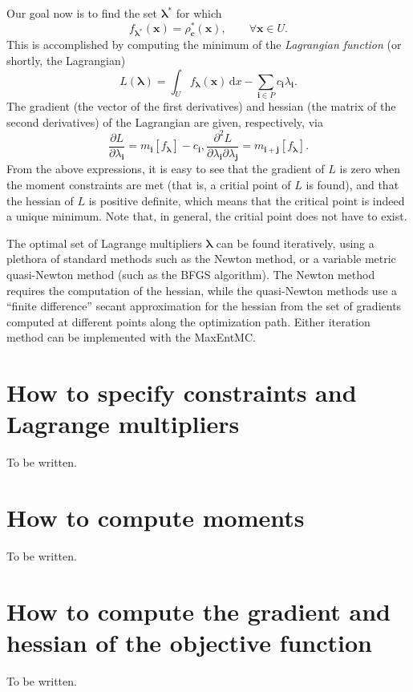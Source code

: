 \documentclass[12pt]{amsart}
\numberwithin{equation}{section}
\newcommand\BS{\boldsymbol}
\newcommand\dif{\,\mathrm{d}}
\newcommand\parderiv[2]{\frac{\partial #1}{\partial #2}}
\begin{document}
Our goal now is to find the set $\BS\lambda^*$ for which
%
\begin{equation}
f_{\BS\lambda^*}(\BS x)=\rho_{\BS c}^*(\BS x), \qquad\forall\BS x\in
U.
\end{equation}
%
This is accomplished by computing the minimum of the {\em Lagrangian
  function} (or shortly, the Lagrangian)
%
\begin{equation}
\label{eq:lagrangian}
L(\BS\lambda)=\int_U f_{\BS\lambda}(\BS x)\dif x-\sum_{\BS i\in
  P}c_{\BS i}\lambda_{\BS i}.
\end{equation}
%
The gradient (the vector of the first derivatives) and hessian (the
matrix of the second derivatives) of the Lagrangian are given,
respectively, via
%
\begin{subequations}
\begin{equation}
\parderiv L{\lambda_{\BS i}}=m_{\BS i}[f_{\BS\lambda}]-c_{\BS i},
\end{equation}
\begin{equation}
\parderiv{^2 L}{\lambda_{\BS i}\partial\lambda_{\BS j}}=m_{\BS i+\BS
  j}[f_{\BS\lambda}].
\end{equation}
\end{subequations}
%
From the above expressions, it is easy to see that the gradient of $L$
is zero when the moment constraints are met (that is, a critial point
of $L$ is found), and that the hessian of $L$ is positive definite,
which means that the critical point is indeed a unique minimum. Note
that, in general, the critial point does not have to exist.

The optimal set of Lagrange multipliers $\BS\lambda$ can be found
iteratively, using a plethora of standard methods such as the Newton
method, or a variable metric quasi-Newton method (such as the BFGS
algorithm). The Newton method requires the computation of the hessian,
while the quasi-Newton methods use a ``finite difference'' secant
approximation for the hessian from the set of gradients computed at
different points along the optimization path. Either iteration method
can be implemented with the MaxEntMC.

\section{How to specify constraints and Lagrange multipliers}
\label{sec:constraints}

To be written.

\section{How to compute moments}
\label{sec:quadrature}

To be written.

\section{How to compute the gradient and hessian of the objective function}
\label{sec:grad_hess}

To be written.
\end{document}
